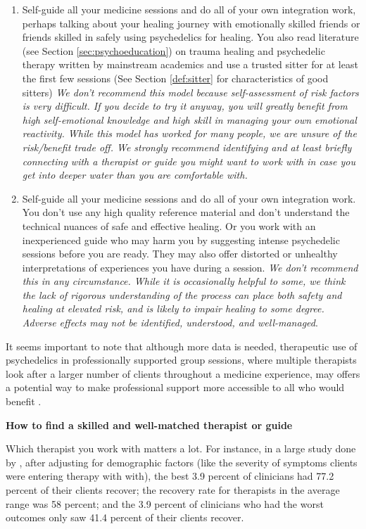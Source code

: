 \documentclass[12pt,letterpaper]{book}
\begin{document}
\begin{enumerate}
    \item Self-guide all your medicine sessions and do all of your own integration work, perhaps talking about your healing journey with emotionally skilled friends or friends skilled in safely using psychedelics for healing. You also read literature (see Section \ref{sec:psychoeducation}) on trauma healing and psychedelic therapy written by mainstream academics and use a trusted sitter for at least the first few sessions (See Section \ref{def:sitter} for characteristics of good sitters) \textit{We don't recommend this model because self-assessment of risk factors is very difficult. If you decide to try it anyway, you will greatly benefit from high self-emotional knowledge and high skill in managing your own emotional reactivity. While this model has worked for many people, we are unsure of the risk/benefit trade off. We strongly recommend identifying and at least briefly connecting with a therapist or guide you might want to work with in case you get into deeper water than you are comfortable with.}
    \item Self-guide all your medicine sessions and do all of your own integration work. You don't use any high quality reference material and don't understand the technical nuances of safe and effective healing. Or you work with an inexperienced guide who may harm you by suggesting intense psychedelic sessions before you are ready. They may also offer distorted or unhealthy interpretations of experiences you have during a session. \textit{We don't recommend this in any circumstance. While it is occasionally helpful to some, we think the lack of rigorous understanding of the process can place both safety and healing at elevated risk, and is likely to impair healing to some degree. Adverse effects may not be identified, understood, and well-managed}.
\end{enumerate}
It seems important to note that although more data is needed, therapeutic use of psychedelics in professionally supported group sessions, where multiple therapists look after a larger number of clients throughout a medicine experience, may offers a potential way to make professional support more accessible to all who would benefit \cite{marseille2023group}.

\noindent \textbf{How to find a skilled and well-matched therapist or guide}
\label{sec:howtofind}

Which therapist you work with matters a lot. For instance, in a large study done by \textcite{firth2019therapistEffects}, after adjusting for demographic factors (like the severity of symptoms clients were entering therapy with with), the best 3.9 percent of clinicians had 77.2 percent of their clients recover; the recovery rate for therapists in the average range was 58 percent; and the 3.9 percent of clinicians who had the worst outcomes only saw 41.4 percent of their clients recover. 
\end{document}
